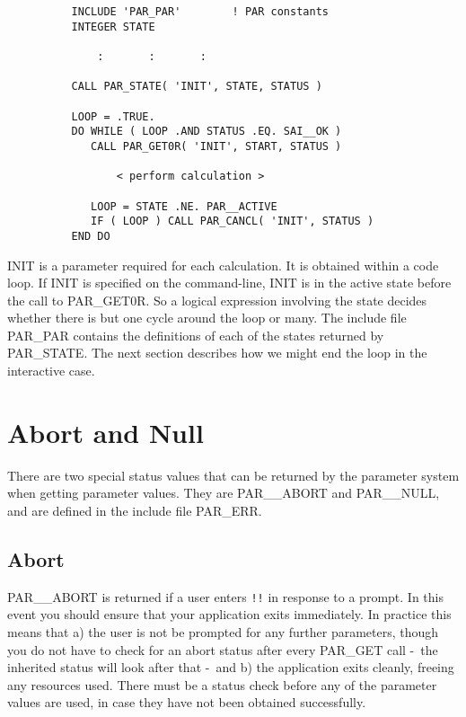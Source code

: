 \documentclass[twoside,11pt]{article}
\newcommand{\xlabel}[1]{}
\newcommand{\dash}{--}
\renewcommand{\dash}{-}
\begin{document}
\begin{verbatim}
          INCLUDE 'PAR_PAR'        ! PAR constants
          INTEGER STATE

              :       :       :

          CALL PAR_STATE( 'INIT', STATE, STATUS )

          LOOP = .TRUE.
          DO WHILE ( LOOP .AND STATUS .EQ. SAI__OK )
             CALL PAR_GET0R( 'INIT', START, STATUS )

                 < perform calculation >

             LOOP = STATE .NE. PAR__ACTIVE
             IF ( LOOP ) CALL PAR_CANCL( 'INIT', STATUS )
          END DO
\end{verbatim}

INIT is a parameter required for each calculation.  It is obtained
within a code loop.  If INIT is specified on the command-line, INIT is
in the active state before the call to PAR\_GET0R.  So a logical
expression involving the state decides whether there is but one cycle
around the loop or many.  The include file PAR\_PAR contains the
definitions of each of the states returned by PAR\_STATE. The next
section describes how we might end the loop in the interactive case. 

\section{\xlabel{abort_and_null}Abort and Null}

There are two special status values that can be returned by the parameter
system when getting parameter values.  They are PAR\_\_ABORT and
PAR\_\_NULL, and are defined in the include file PAR\_ERR.

\subsection{\xlabel{abort}Abort}

PAR\_\_ABORT is returned if a user enters {\tt !!} in response to a
prompt.  In this event you should ensure that your application exits
immediately.  In practice this means that a) the user is not be prompted
for any further parameters, though you do not have to check for an abort
status after every PAR\_GET call \dash\ the inherited status will look after
that \dash\ and b) the application exits cleanly, freeing any resources used. 
There must be a status check before any of the parameter values are
used, in case they have not been obtained successfully.
\end{document}
